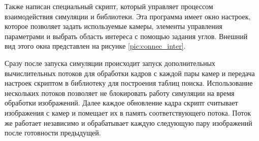 Также написан специальный скрипт, который управляет процессом взаимодействия симуляции и библиотеки. 
Эта программа имеет окно настроек, которое позволяет задать
используемые камеры, элементы управления параметрами  и выбрать область интереса с помощью задания углов.
 Внешний вид этого окна представлен на рисунке \ref{pic:connec_inter}.


Сразу после запуска симуляции происходит запуск дополнительных вычислительных потоков для обработки 
кадров с каждой пары камер и передача настроек скриптом в библиотеку для построения таблиц поиска.           %
Использование нескольких потоков позволяет не блокировать работу симуляции на время обработки изображений.  
Далее каждое обновление кадра скрипт считывает изображения с камер и помещает их в память соответствующего 
потока. Поток же работает независимо и обрабатывает каждую следующую пару изображений после готовности 
предыдущей. 